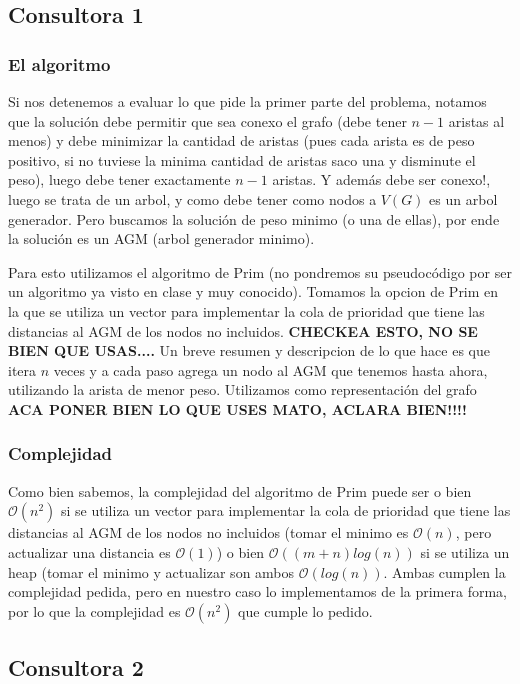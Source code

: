 \documentclass[A4paper,oneside,fleqn,11pt]{article}
\theoremstyle{definition}
\begin{document}
\subsection{Consultora 1}

\subsubsection{El algoritmo}
Si nos detenemos a evaluar lo que pide la primer parte del problema, notamos que la solución debe permitir que sea conexo el grafo (debe tener $n-1$ aristas al menos) y debe minimizar la cantidad de aristas (pues cada arista es de peso positivo, si no tuviese la minima cantidad de aristas saco una y disminute el peso), luego debe tener exactamente $n-1$ aristas. Y además debe ser conexo!, luego se trata de un arbol, y como debe tener como nodos a $V(G)$ es un arbol generador. Pero buscamos la solución de peso minimo (o una de ellas), por ende la solución es un AGM (arbol generador minimo). 

Para esto utilizamos el algoritmo de Prim (no pondremos su pseudocódigo por ser un algoritmo ya visto en clase y muy conocido). Tomamos la opcion de Prim en la que se utiliza un vector para implementar la cola de prioridad que tiene las distancias al AGM de los nodos no incluidos. \textbf{CHECKEA ESTO, NO SE BIEN QUE USAS....} Un breve resumen y descripcion de lo que hace es que itera $n$ veces y a cada paso agrega un nodo al AGM que tenemos hasta ahora, utilizando la arista de menor peso. Utilizamos como representación del grafo \textbf{ACA PONER BIEN LO QUE USES MATO, ACLARA BIEN!!!!}


\subsubsection{Complejidad}

Como bien sabemos, la complejidad del algoritmo de Prim puede ser o bien $\mathcal{O} (n^2)$ si se utiliza un vector para implementar la cola de prioridad que tiene las distancias al AGM de los nodos no incluidos (tomar el minimo es $\mathcal{O} (n)$, pero actualizar una distancia es $\mathcal{O} (1)$) o bien $\mathcal{O} ((m+n) log(n))$ si se utiliza un heap (tomar el minimo y actualizar son ambos $\mathcal{O} (log(n))$. Ambas cumplen la complejidad pedida, pero en nuestro caso lo implementamos de la primera forma, por lo que la complejidad es $\mathcal{O} (n^2)$ que cumple lo pedido.

\subsection{Consultora 2}
\end{document}
